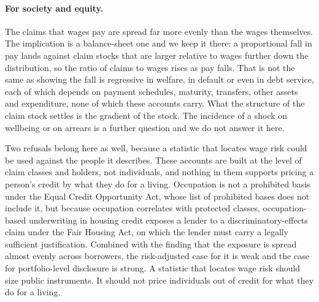 \paragraph{For society and equity.} The claims that wages pay are spread far more evenly than the
wages themselves. The implication is a balance-sheet one and we keep it there: a proportional
fall in pay lands against claim stocks that are larger relative to wages further down the
distribution, so the ratio of claims to wages rises as pay falls. That is not the same as showing
the fall is regressive in welfare, in default or even in debt service, each of which depends on
payment schedules, maturity, transfers, other assets and expenditure, none of which these
accounts carry. What the structure of the claim stock settles is the gradient of the stock. The
incidence of a shock on wellbeing or on arrears is a further question and we do not answer it
here.

Two refusals belong here as well, because a statistic that locates wage risk could be used
against the people it describes. These accounts are built at the level of claim classes and
holders, not individuals, and nothing in them supports pricing a person's credit by what they do
for a living. Occupation is not a prohibited basis under the Equal Credit Opportunity Act, whose
list of prohibited bases does not include it, but because occupation correlates with protected
classes, occupation-based underwriting in housing credit exposes a lender to a
discriminatory-effects claim under the Fair Housing Act, on which the lender must carry a legally
sufficient justification. Combined with the finding that the exposure is spread almost evenly
across borrowers, the risk-adjusted case for it is weak and the case for portfolio-level
disclosure is strong. A statistic that locates wage risk should size public instruments. It
should not price individuals out of credit for what they do for a living.
